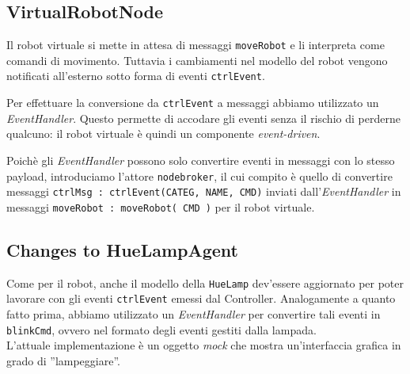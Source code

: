 \documentclass{../llncs}
\newcommand{\codescript}[1]{{\mbox{\small{\texttt{#1}}}}\xspace}
\begin{document}
 

\subsection{VirtualRobotNode}
Il robot virtuale si mette in attesa di messaggi \codescript{moveRobot} e li interpreta come comandi di movimento. Tuttavia i cambiamenti nel modello del robot vengono notificati all'esterno sotto forma di eventi \codescript{ctrlEvent}.

Per effettuare la conversione da \codescript{ctrlEvent} a messaggi abbiamo utilizzato un \emph{EventHandler}. Questo permette di accodare gli eventi senza il rischio di perderne qualcuno: il robot virtuale è quindi un componente \emph{event-driven}.

 

Poichè gli \emph{EventHandler} possono solo convertire eventi in messaggi con lo stesso payload, introduciamo l'attore \texttt{nodebroker}, il cui compito è quello di convertire messaggi \codescript{ctrlMsg : ctrlEvent(CATEG, NAME, CMD)} inviati dall'\emph{EventHandler} in messaggi \codescript{moveRobot : moveRobot( CMD )} per il robot virtuale.

 

\subsection{Changes to HueLampAgent}
Come per il robot, anche il modello della \texttt{HueLamp} dev'essere aggiornato per poter lavorare con gli eventi \codescript{ctrlEvent} emessi dal Controller. Analogamente a quanto fatto prima, abbiamo utilizzato un \emph{EventHandler} per convertire tali eventi in \codescript{blinkCmd}, ovvero nel formato degli eventi gestiti dalla lampada.\\

L'attuale implementazione è un oggetto \emph{mock} che mostra un'interfaccia grafica in grado di ''lampeggiare''.

 

\end{document}
